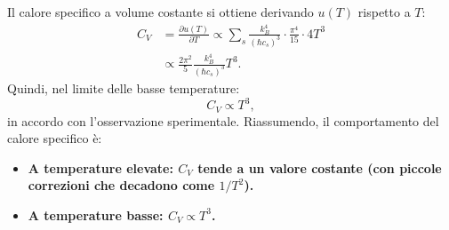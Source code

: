Il calore specifico a volume costante si ottiene derivando \(u(T)\) rispetto a \(T\):
\begin{equation}
\begin{split}
    C_V &= \frac{\partial u(T)}{\partial T} \propto \sum_s \frac{k_B^4}{(\hbar c_s)^3} \cdot \frac{\pi^4}{15} \cdot 4T^3 \\
    &\propto \frac{2\pi^2}{5}\frac{k_B^4}{(\hbar c_s)^3} T^3.
\end{split}
\end{equation}
Quindi, nel limite delle basse temperature:
\begin{equation}
    C_V \propto T^3,
\end{equation}
in accordo con l'osservazione sperimentale.
\bigskip
\noindent Riassumendo, il comportamento del calore specifico è:
\begin{itemize}
    \item \textbf{A temperature elevate: \(C_V\) tende a un valore costante (con piccole correzioni che decadono come \(1/T^2\)).}
    \item \textbf{A temperature basse: \(C_V \propto T^3\).}
\end{itemize}
